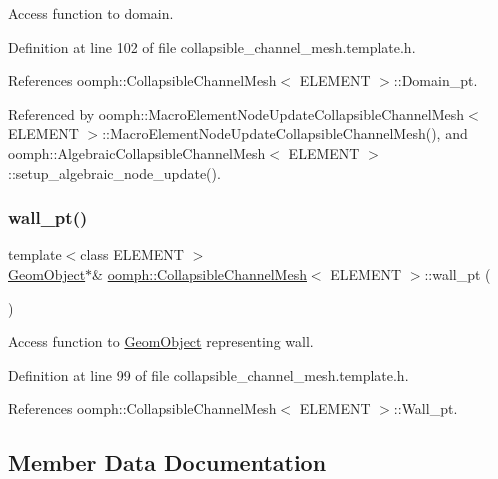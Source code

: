 Access function to domain. 



Definition at line 102 of file collapsible\+\_\+channel\+\_\+mesh.\+template.\+h.



References oomph\+::\+Collapsible\+Channel\+Mesh$<$ E\+L\+E\+M\+E\+N\+T $>$\+::\+Domain\+\_\+pt.



Referenced by oomph\+::\+Macro\+Element\+Node\+Update\+Collapsible\+Channel\+Mesh$<$ E\+L\+E\+M\+E\+N\+T $>$\+::\+Macro\+Element\+Node\+Update\+Collapsible\+Channel\+Mesh(), and oomph\+::\+Algebraic\+Collapsible\+Channel\+Mesh$<$ E\+L\+E\+M\+E\+N\+T $>$\+::setup\+\_\+algebraic\+\_\+node\+\_\+update().

\mbox{\label{classoomph_1_1CollapsibleChannelMesh_a04ffeb61678763dfd250962ea9ba614b}} 
\subsubsection{\texorpdfstring{wall\+\_\+pt()}{wall\_pt()}}
{\footnotesize\ttfamily template$<$class E\+L\+E\+M\+E\+NT $>$ \\
\hyperlink{classoomph_1_1GeomObject}{Geom\+Object}$\ast$\& \hyperlink{classoomph_1_1CollapsibleChannelMesh}{oomph\+::\+Collapsible\+Channel\+Mesh}$<$ E\+L\+E\+M\+E\+NT $>$\+::wall\+\_\+pt (\begin{DoxyParamCaption}{ }\end{DoxyParamCaption})\hspace{0.3cm}{\ttfamily [inline]}}



Access function to \hyperlink{classoomph_1_1GeomObject}{Geom\+Object} representing wall. 



Definition at line 99 of file collapsible\+\_\+channel\+\_\+mesh.\+template.\+h.



References oomph\+::\+Collapsible\+Channel\+Mesh$<$ E\+L\+E\+M\+E\+N\+T $>$\+::\+Wall\+\_\+pt.



\subsection{Member Data Documentation}
\mbox{\label{classoomph_1_1CollapsibleChannelMesh_ae7b9e4a110dded8399a6daf6f48a9e23}} 
